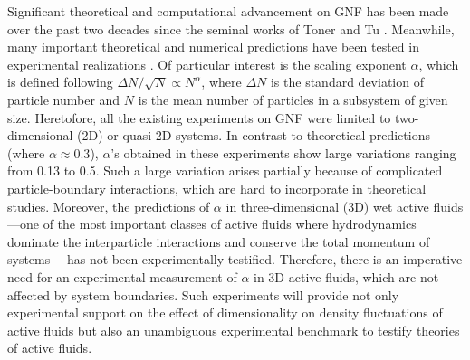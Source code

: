 \documentclass[twocolumn,aps,prl,amsmath,amssymb,longbibliography]{revtex4-2}
\begin{document}
Significant theoretical and computational advancement on GNF has been made over the past two decades since the seminal works of Toner and Tu \cite{Toner1995,Tu1998,Toner1998,AditiSimha2002,Ramaswamy2003,Toner2005,Chate2008,Mishra2010,
Dey2012,Saintillan2012,Saintillan2013,Ngo2014,Mahault2019}. Meanwhile, many important theoretical and numerical predictions have been tested in experimental realizations
\cite{Narayan2007, Aranson2008, Deseigne2010, Zhang2010, Schaller2013,
Nishiguchi2017, Kawaguchi2017, Palacci2013}.
Of particular interest is the scaling exponent $\alpha$, which is defined following $\Delta N /\sqrt N \propto N^\alpha$, where $\Delta N$ is the standard deviation of particle number and $N$ is the mean number of particles in a subsystem of given size. Heretofore, all the existing experiments on GNF were limited to two-dimensional (2D) or quasi-2D systems. In contrast to theoretical predictions (where $\alpha \approx 0.3$), $\alpha$'s obtained in these experiments show large variations ranging from 0.13 to 0.5. Such a large variation arises partially because of complicated particle-boundary interactions, which are hard to incorporate in theoretical studies. Moreover, the predictions of $\alpha$ in three-dimensional (3D) wet active fluids---one of the most important classes of active fluids where hydrodynamics dominate the interparticle interactions and conserve the total momentum of systems \cite{Marchetti2013}---has not been experimentally testified. Therefore, there is an imperative need for an experimental measurement of $\alpha$ in 3D active fluids, which are not affected by system boundaries. Such experiments will provide not only experimental support on the effect of dimensionality on density fluctuations of active fluids \cite{Marchetti2013} but also an unambiguous experimental benchmark to testify theories of active fluids.
\end{document}
